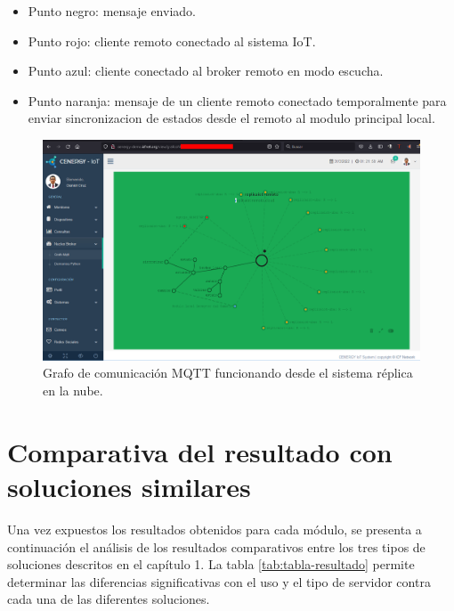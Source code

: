 \begin{itemize}
\item Punto negro: mensaje enviado.
\item Punto rojo: cliente remoto conectado al sistema IoT.
\item Punto azul: cliente conectado al broker remoto en modo escucha.
\item Punto naranja: mensaje de un cliente remoto conectado temporalmente para enviar sincronizacion de estados desde el remoto al modulo principal local. 
\end{itemize}

\begin{landscape} %
\begin{figure}[htpb]
\centering 
\includegraphics[width=1.6\textwidth]{./Figures/test/replicador/remoto.png}
\caption{Grafo de comunicación MQTT funcionando desde el sistema réplica en la nube.}
\label{fig:graforemoto}
\end{figure}
\end{landscape} 

\section{Comparativa del resultado con soluciones similares}

Una vez expuestos los resultados obtenidos para cada módulo, se presenta a continuación el análisis de los resultados comparativos entre los tres tipos de soluciones descritos en el capítulo 1. La tabla \ref{tab:tabla-resultado} permite determinar las diferencias significativas con el uso y el tipo de servidor contra cada una de las diferentes soluciones.

